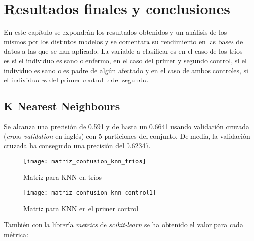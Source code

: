 
\chapter{Resultados finales y conclusiones}\label{Resultados}
En este capítulo se expondrán los resultados obtenidos y un análisis de los mismos por los distintos modelos y se comentará su rendimiento en las bases de datos a las que se han aplicado. La variable a clasificar es en el caso de los tríos es si el individuo es sano o enfermo, en el caso del primer y segundo control, si el individuo es sano o es padre de algún afectado y en el caso de ambos controles, si el individuo es del primer control o del segundo.

\section{K Nearest Neighbours}
Se alcanza una precisión de 0.591 y de hasta un 0.6641 usando validación cruzada (\textit{cross validation} en inglés) con 5 particiones del conjunto. De media, la validación cruzada ha conseguido una precisión del 0.62347.\\

\begin{figure}[H]
\centering
\begin{minipage}[t]{.5\textwidth}
  \texttt{[image: matriz\_confusion\_knn\_trios]}
  \caption{Matriz para KNN en tríos}
  \label{fig:confusion-knn-trios}
\end{minipage}%
\begin{minipage}[t]{.5\textwidth}
  \texttt{[image: matriz\_confusion\_knn\_control1]}
  \caption{Matriz para KNN en el primer control}
  \label{fig:confusion-knn-control1}
\end{minipage}
\end{figure}

También con la librería \textit{metrics} de \textit{scikit-learn} se ha obtenido el valor para cada métrica:

